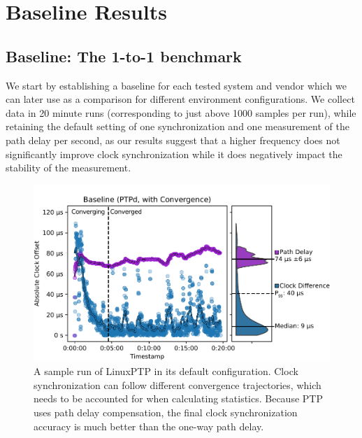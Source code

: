 
\section{Baseline Results}

\subsection{Baseline: The 1-to-1 benchmark}

We start by establishing a baseline for each tested system and vendor which we can later use as a comparison for different environment configurations. We collect data in 20 minute runs (corresponding to just above 1000 samples per run), while retaining the default setting of one synchronization and one measurement of the path delay per second, as our results suggest that a higher frequency does not significantly improve clock synchronization while it does negatively impact the stability of the measurement.

\begin{figure}
    \includegraphics[width=\linewidth]{res/generated/base/rpi08-convergence_2.pdf}
    \caption{A sample run of LinuxPTP in its default configuration. Clock synchronization can follow different convergence trajectories, which needs to be accounted for when calculating statistics. Because PTP uses path delay compensation, the final clock synchronization accuracy is much better than the one-way path delay.}
    \label{fig:baseline_sample}
\end{figure}

